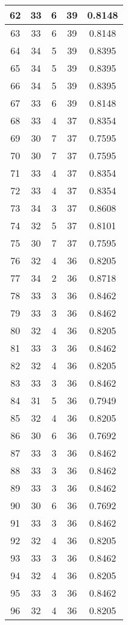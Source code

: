 \documentclass[letterpaper, 12pt]{article}
\begin{document}
\begin{longtable}{|c|c|c|c|c|}
\hline
62 & 33 & 6 & 39 & 0.8148 \\
\hline
63 & 33 & 6 & 39 & 0.8148 \\
\hline
64 & 34 & 5 & 39 & 0.8395 \\
\hline
65 & 34 & 5 & 39 & 0.8395 \\
\hline
66 & 34 & 5 & 39 & 0.8395 \\
\hline
67 & 33 & 6 & 39 & 0.8148 \\
\hline
68 & 33 & 4 & 37 & 0.8354 \\
\hline
69 & 30 & 7 & 37 & 0.7595 \\
\hline
70 & 30 & 7 & 37 & 0.7595 \\
\hline
71 & 33 & 4 & 37 & 0.8354 \\
\hline
72 & 33 & 4 & 37 & 0.8354 \\
\hline
73 & 34 & 3 & 37 & 0.8608 \\
\hline
74 & 32 & 5 & 37 & 0.8101 \\
\hline
75 & 30 & 7 & 37 & 0.7595 \\
\hline
76 & 32 & 4 & 36 & 0.8205 \\
\hline
77 & 34 & 2 & 36 & 0.8718 \\
\hline
78 & 33 & 3 & 36 & 0.8462 \\
\hline
79 & 33 & 3 & 36 & 0.8462 \\
\hline
80 & 32 & 4 & 36 & 0.8205 \\
\hline
81 & 33 & 3 & 36 & 0.8462 \\
\hline
82 & 32 & 4 & 36 & 0.8205 \\
\hline
83 & 33 & 3 & 36 & 0.8462 \\
\hline
84 & 31 & 5 & 36 & 0.7949 \\
\hline
85 & 32 & 4 & 36 & 0.8205 \\
\hline
86 & 30 & 6 & 36 & 0.7692 \\
\hline
87 & 33 & 3 & 36 & 0.8462 \\
\hline
88 & 33 & 3 & 36 & 0.8462 \\
\hline
89 & 33 & 3 & 36 & 0.8462 \\
\hline
90 & 30 & 6 & 36 & 0.7692 \\
\hline
91 & 33 & 3 & 36 & 0.8462 \\
\hline
92 & 32 & 4 & 36 & 0.8205 \\
\hline
93 & 33 & 3 & 36 & 0.8462 \\
\hline
94 & 32 & 4 & 36 & 0.8205 \\
\hline
95 & 33 & 3 & 36 & 0.8462 \\
\hline
96 & 32 & 4 & 36 & 0.8205 \\

\end{longtable}
\end{document}

